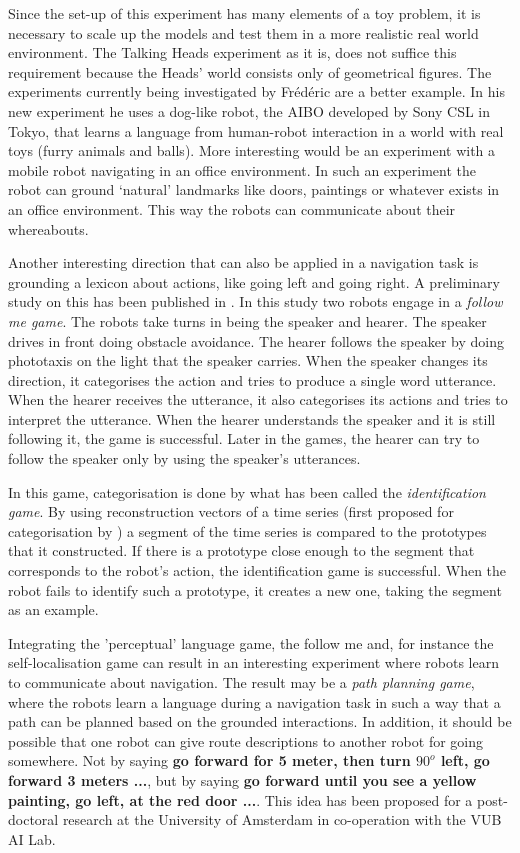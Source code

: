 Since the set-up of this experiment has many elements of a toy problem, it is necessary to scale up the models and test them in a more realistic real world environment. The Talking Heads experiment as it is, does not suffice this requirement because the Heads' world consists only of geometrical figures. The experiments currently being investigated by Fr\'ed\'eric \citet{kaplan:2000} are a better example. In his new experiment he uses a dog-like robot, the AIBO developed by Sony CSL in Tokyo, that learns a language from human-robot interaction in a world with real toys (furry animals and balls). More interesting would be an experiment with a mobile robot navigating in an office environment. In such an experiment the robot can ground `natural' landmarks like doors, paintings or whatever exists in an office environment. This way the robots can communicate about their whereabouts.

Another interesting direction that can also be applied in a navigation task is grounding a lexicon about actions, like going left and going right. A preliminary study on this has been published in \citep{vogt:1999a,vogt:2000}. In this study two robots engage in a {\em follow me game}. The robots take turns in being the speaker and hearer. The speaker drives in front doing obstacle avoidance. The hearer follows the speaker by doing phototaxis on the light that the speaker carries. When the speaker changes its direction, it categorises the action and tries to produce a single word utterance. When the hearer receives the utterance, it also categorises its actions and tries to interpret the utterance. When the hearer understands the speaker and it is still following it, the game is successful. Later in the games, the hearer can try to follow the speaker only by using the speaker's utterances.

In this game, categorisation is done by what has been called the {\em identification game}. By using reconstruction vectors of a time series (first proposed for categorisation by \citep{rosenstein:1998a}) a segment of the time series is compared to the prototypes that it constructed. If there is a prototype close enough to the segment that corresponds to the robot's action, the identification game is successful. When the robot fails to identify such a prototype, it creates a new one, taking the segment as an example.

Integrating the 'perceptual' language game, the follow me and, for instance the self-localisation game can result in an interesting experiment where robots learn to communicate about navigation. The result may be a {\em path planning game}, where the robots learn a language during a navigation task in such a way that a path can be planned based on the grounded interactions. In addition, it should be possible that one robot can give route descriptions to another robot for going somewhere. Not by saying {\bf go forward for 5 meter, then turn $90^o$ left, go forward 3 meters ...}, but by saying {\bf go forward until you see a yellow painting, go left, at the red door ...}. This idea has been proposed for a post-doctoral research at the University of Amsterdam in co-operation with the VUB AI Lab.

